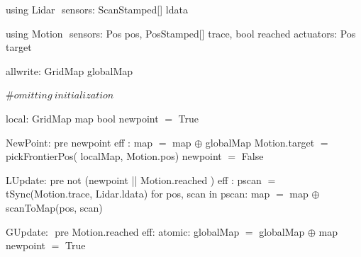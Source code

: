 using Lidar $\label{lidardef}$
    sensors:
       ScanStamped[] ldata

using Motion $\label{moddef}$
    sensors:
        Pos pos,
        PosStamped[] trace,
        bool reached
    actuators:
        Pos target

allwrite:$\label{awvar}$
    GridMap globalMap

#$\mathit{omitting\ initialization}$

local:
   GridMap map
   bool newpoint $=$ True

NewPoint:$\label{newpt}$
  pre newpoint
  eff : map $=$ map $\oplus$ globalMap
        Motion.target $=$ pickFrontierPos(
                              localMap, Motion.pos)
        newpoint $=$ False

LUpdate:$\label{lup}$
   pre not (newpoint || Motion.reached )
   eff : pscan $=$ tSync(Motion.trace, Lidar.ldata)
         for pos, scan in pscan:
             map $=$ map $\oplus$ scanToMap(pos, scan)

GUpdate: $\label{gup}$
  pre Motion.reached
  eff: atomic:
           globalMap $=$ globalMap $\oplus$ map
        newpoint $=$ True
